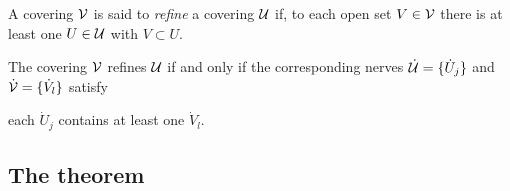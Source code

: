 \begin{defn}
  A covering $\mathcal{V}$ is said to \emph{refine} a covering $\mathcal{U}$ if, to each open
  set $V\in\mathcal{V}$ there is at least one $U\in\mathcal{U}$ with $V\subset U$.
\end{defn}
\begin{prop}
  The covering $\mathcal{V}$ refines $\mathcal{U}$ if and only if the corresponding nerves
  $\dot{\mathcal{U}}=\{\dot U_j\}$ and $\dot{\mathcal{V}}=\{\dot V_l\}$ satisfy
  \begin{einr}
    each $\dot U_j$ contains at least one $\dot V_l$.
  \end{einr}
\end{prop}

\subsection{The theorem}
\begin{comment}
  \begin{lem}
    Since the sections of the sheaf $\Lambda(A^0)$ are solutions of the system
    $[A^0,A^0]$ (cf.\ Definition~\ref{defn:StokesSheaf}),
    the theory of differential equations\PROBLEM[source?] tells us that
    \rewrite{sections extend uniquely}.
    Thus we can extend any germ $\phi_\theta\in\Lambda_\theta(A^0)$ uniquely to
    a section $\phi\in\Gamma(\Omega;\Lambda(A^0))$, where $\Omega$ is the
    maximal arc of definition around $\theta$.

    \PROBLEM[The flatness property implicitly satisfied?]
  \end{lem}
\end{comment}
